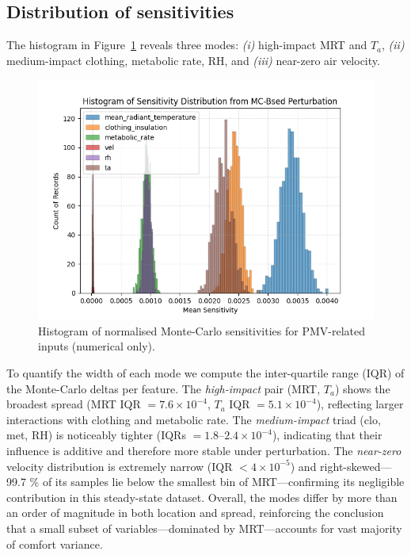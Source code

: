 \documentclass{article}
\theoremstyle{plain}
\theoremstyle{definition}
\theoremstyle{remark}
\begin{document}
\subsection{Distribution of sensitivities}\label{ssec:dist}
The histogram in Figure~\ref{fig:hist} reveals three modes:
\emph{(i)} high-impact MRT and $T_a$,
\emph{(ii)} medium-impact clothing, metabolic rate, RH,
and \emph{(iii)} near-zero air velocity. 
\begin{figure}[h]
  \centering
  \includegraphics[width=\columnwidth]{Hist_icml.png}
  \caption{Histogram of normalised Monte-Carlo sensitivities 
           for PMV-related inputs (numerical only).}
  \label{fig:hist}
\end{figure}
To quantify the width of each mode we compute the inter-quartile range (IQR) of the Monte-Carlo deltas per feature. The \emph{high-impact} pair (MRT, $T_a$) shows the broadest spread (MRT IQR $=7.6{\times}10^{-4}$, $T_a$ IQR $=5.1{\times}10^{-4}$), reflecting larger interactions with clothing and metabolic rate. The \emph{medium-impact} triad (clo, met, RH) is noticeably tighter (IQRs $=1.8$–$2.4{\times}10^{-4}$), indicating that their influence is additive and therefore more stable under perturbation. The \emph{near-zero} velocity distribution is extremely narrow (IQR $<\!4{\times}10^{-5}$) and right-skewed—99.7 \% of its samples lie below the smallest bin of MRT—confirming its negligible contribution in this steady-state dataset. Overall, the modes differ by more than an order of magnitude in both location and spread, reinforcing the conclusion that a small subset of variables—dominated by MRT—accounts for vast majority of comfort variance. 
\end{document}
